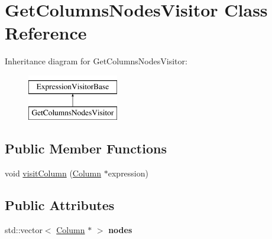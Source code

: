 \hypertarget{class_get_columns_nodes_visitor}{\section{Get\+Columns\+Nodes\+Visitor Class Reference}
\label{class_get_columns_nodes_visitor}
}
Inheritance diagram for Get\+Columns\+Nodes\+Visitor\+:\begin{figure}[H]
\begin{center}
\leavevmode
\includegraphics[height=2.000000cm]{class_get_columns_nodes_visitor}
\end{center}
\end{figure}
\subsection*{Public Member Functions}
\begin{DoxyCompactItemize}
\item 
void \hyperlink{class_get_columns_nodes_visitor_adcd58020e010392df2b543b6a4bbc46b}{visit\+Column} (\hyperlink{class_column}{Column} $\ast$expression)
\end{DoxyCompactItemize}
\subsection*{Public Attributes}
\begin{DoxyCompactItemize}
\item 
\hypertarget{class_get_columns_nodes_visitor_ac68ee0c1090596d4e25a5dc5a478533b}{std\+::vector$<$ \hyperlink{class_column}{Column} $\ast$ $>$ {\bfseries nodes}}\label{class_get_columns_nodes_visitor_ac68ee0c1090596d4e25a5dc5a478533b}

\end{DoxyCompactItemize}


